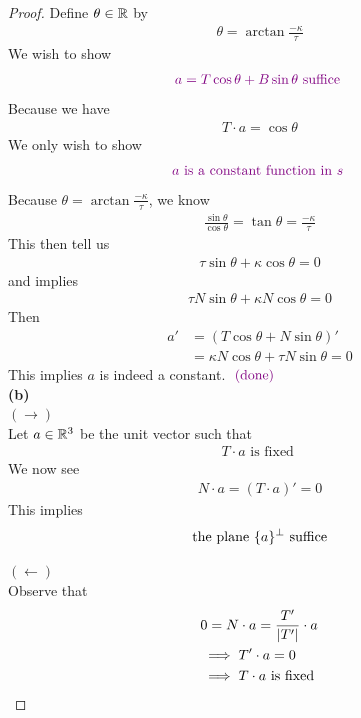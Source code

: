 \documentclass{report}
\begin{document}
\begin{proof}
Define $\theta\in\mathbb{R}$ by 
\begin{align*}
\theta=\arctan \frac{-\kappa}{\tau}
\end{align*}
We wish to show 
\begin{align*}
  \textcolor{violet}{a=T \cos \theta + B \sin \theta \text{ suffice }}
\end{align*}
Because we have 
 \begin{align*}
T\cdot a= \cos \theta 
\end{align*}
We only wish to show 
\begin{align*}
  \textcolor{violet}{a\text{ is a constant function in $s$ }}
\end{align*}
Because $\theta=\arctan \frac{-\kappa}{\tau}$, we know 
\begin{align*}
\frac{\sin \theta}{\cos \theta}=\tan \theta = \frac{-\kappa}{\tau}
\end{align*}
This then tell us 
\begin{align*}
\tau \sin \theta + \kappa \cos \theta =0
\end{align*}
and implies 
\begin{align*}
\tau N \sin \theta + \kappa N \cos \theta =0
\end{align*}
Then 
\begin{align*}
a'&=(T\cos \theta+ N \sin \theta)'\\
&= \kappa N \cos \theta + \tau N \sin \theta =0 
\end{align*}
This implies $a$ is indeed a constant.  $\textcolor{violet}{\text{ (done) }}$\\

\textbf{(b)}\\

$(\longrightarrow)$\\

Let $a\in\mathbb{R}^3$ be the unit vector such that 
\begin{align*}
T\cdot a \text{ is fixed }
\end{align*}
We now see 
\begin{align*}
N\cdot a= (T\cdot a)'=0
\end{align*}
This implies 
\begin{align*}
\text{ the plane $\{ a \}^{\perp}$ suffice }
\end{align*}

$(\longleftarrow)$\\

Observe that 
\begin{align*}
&0=N \cdot a= \frac{T'}{\left|T'\right|} \cdot a \\
&\implies T' \cdot a =0\\
&\implies T\cdot a\text{ is fixed }
\end{align*}


\end{proof}
\end{document}
